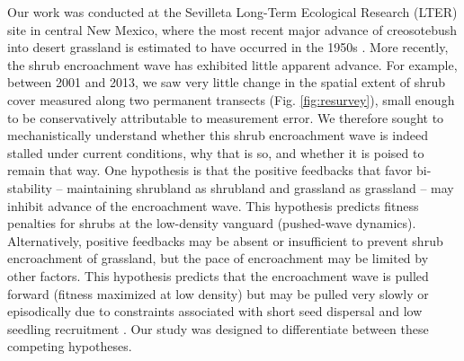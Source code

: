 \documentclass[11pt]{article}\usepackage[]{graphicx}\usepackage[usenames,dvipsnames]{xcolor}
\begin{document}
Our work was conducted at the Sevilleta Long-Term Ecological Research (LTER) site in central New Mexico, where the most recent major advance of creosotebush into desert grassland is estimated to have occurred in the 1950s \citep{moreno2016seed}.
More recently, the shrub encroachment wave has exhibited little apparent advance.  
For example, between 2001 and 2013, we saw very little change in the spatial extent of shrub cover measured along two permanent transects (Fig. \ref{fig:resurvey}), small enough to be conservatively attributable to measurement error.
We therefore sought to mechanistically understand whether this shrub encroachment wave is indeed stalled under current conditions, why that is so, and whether it is poised to remain that way.
One hypothesis is that the positive feedbacks that favor bi-stability -- maintaining shrubland as shrubland and grassland as grassland -- may inhibit advance of the encroachment wave. 
This hypothesis predicts fitness penalties for shrubs at the low-density vanguard (pushed-wave dynamics). 
Alternatively, positive feedbacks may be absent or insufficient to prevent shrub encroachment of grassland, but the pace of encroachment may be limited by other factors.
This hypothesis predicts that the encroachment wave is pulled forward (fitness maximized at low density) but may be pulled very slowly or episodically due to constraints associated with short seed dispersal and low seedling recruitment \citep{moreno2016seed,boyd1983postdispersal}.
Our study was designed to differentiate between these competing hypotheses.


\end{document}

